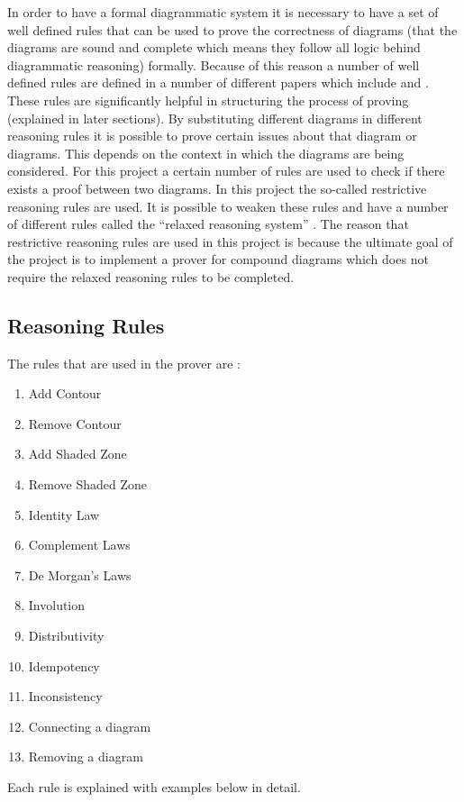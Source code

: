 \documentclass[10pt, a4paper, titlepage]{article}
\begin{document}
In order to have a formal diagrammatic system it is necessary to have a set of well defined rules that can be used to prove the correctness of diagrams (that the diagrams are sound and complete which means they follow all logic behind diagrammatic reasoning) formally. Because of this reason a number of well defined rules are defined in a number of different papers which include \cite{Fish_2007} and \cite{Gem_Judith}. These rules are significantly helpful in structuring the process of proving (explained in later sections). By substituting different diagrams in different reasoning rules it is possible to prove certain issues about that diagram or diagrams. This depends on the context in which the diagrams are being considered. For this project a certain number of rules are used to check if there exists a proof between two diagrams. In this project the so-called restrictive reasoning rules are used. It is possible to weaken these rules and have a number of different rules called the “relaxed reasoning system” \cite{Fish_2007}. The reason that restrictive reasoning rules are used in this project is because the ultimate goal of the project is to implement a prover for compound diagrams which does not require the relaxed reasoning rules to be completed.  

\subsection{Reasoning Rules}
The rules that are used in the prover are :
\begin{enumerate}
\item Add Contour
\item Remove Contour
\item Add Shaded Zone
\item Remove Shaded Zone
\item Identity Law
\item Complement Laws
\item De Morgan's Laws
\item Involution
\item Distributivity
\item Idempotency 
\item Inconsistency
\item Connecting a diagram
\item Removing a diagram
\end{enumerate}

Each rule is explained with examples below in detail.
\end{document}
